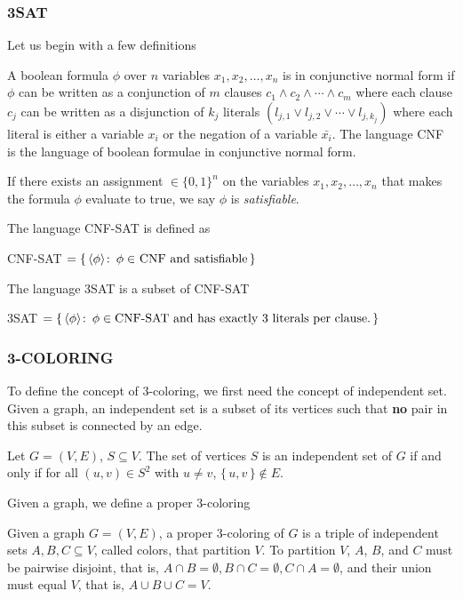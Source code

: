 \subsubsection{3SAT} Let us begin with a few definitions
\begin{definition}
	A boolean formula $\phi$ over $n$ variables $x_1,x_2,\ldots,x_n$ is in
	conjunctive normal form if $\phi$ can be
	written as a conjunction of $m$ clauses $c_1 \land c_2 \land \cdots \land
	c_m$ where each clause $c_j$ can be written as a disjunction of
	$k_j$ literals
	$(l_{j,1} \lor l_{j,2} \lor \cdots \lor l_{j,k_j})$ where each literal is
	either a variable $x_i$ or the negation of a variable $\bar{x_i}$.
	The language CNF is the language of boolean formulae in conjunctive normal
	form.
\end{definition}

\begin{definition}[Satisfiability]
  If there exists an
  assignment $\in \{0,1\}^n$ on the variables $x_1,x_2,\ldots,x_n$ that
  makes the formula $\phi$ evaluate to true, we say $\phi$ is
  \emph{satisfiable}.
\end{definition}

The language CNF-SAT is defined as
\begin{definition}
  CNF-SAT $= \{\, \langle \phi \rangle \colon\, \text{$\phi \in$ CNF and satisfiable}\,\}$
\end{definition}

The language 3SAT is a subset of CNF-SAT
\begin{definition}
  3SAT $= \{\,\langle \phi \rangle \colon\, \phi \in \text{CNF-SAT and has
  exactly 3 literals per clause.}\,\}$
\end{definition}

\subsubsection{3-COLORING}
To define the concept of 3-coloring, we first need the concept of independent set.
Given a graph, an independent set is a subset of its vertices such that
\textbf{no} pair in this subset is connected by an edge.
\begin{definition}
  Let $G=(V,E)$, $S\subseteq V$. The set of vertices $S$ is an independent set
  of $G$ if and only if for all $(u,v) \in S^2$ with $u\ne v$, $\{\,u,v\,\} \not\in E$.
\end{definition}

Given a graph, we define a proper 3-coloring
\begin{definition}
  Given a graph $G=(V,E)$, a proper 3-coloring of $G$ is a triple of
  independent sets $A,B,C\subseteq V$, called colors, that partition $V$. To
  partition $V$, $A$, $B$, and $C$ must be pairwise
  disjoint, that is, $A\cap B =\emptyset,B\cap C=\emptyset,C\cap A =\emptyset$,
  and their union must equal $V$, that is, $A\cup B\cup C = V$.
\end{definition}


